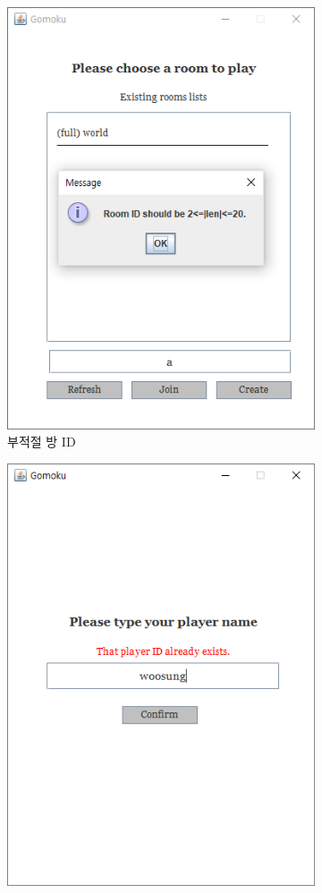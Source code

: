 \documentclass[a4paper, 10pt]{article}
\begin{document}
\begin{figure}[h]
\begin{subfigure}{.24\textwidth}
    \includegraphics[width=.9\linewidth]{resource/improper_roomID}
    \caption{부적절 방 ID}
    \label{fig:improper_roomID}
  \end{subfigure}
  \begin{subfigure}{.24\textwidth}
    \centering
    \includegraphics[width=.9\linewidth]{resource/existing_playerID}

\end{subfigure}
\end{figure}
\end{document}
